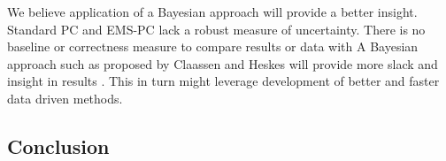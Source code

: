 \documentclass[a4paper, 10pt, english, onecolumn]{article}
\begin{document}
We believe application of a Bayesian approach will provide a better insight.
Standard PC and EMS-PC lack a robust measure of uncertainty.
There is no baseline or correctness measure to compare results or data with
A Bayesian approach such as proposed by Claassen and Heskes will provide more slack and insight in results \cite{claassen2012}.
This in turn might leverage development of better and faster data driven methods.



\subsection{Conclusion}


{}

\end{document}
